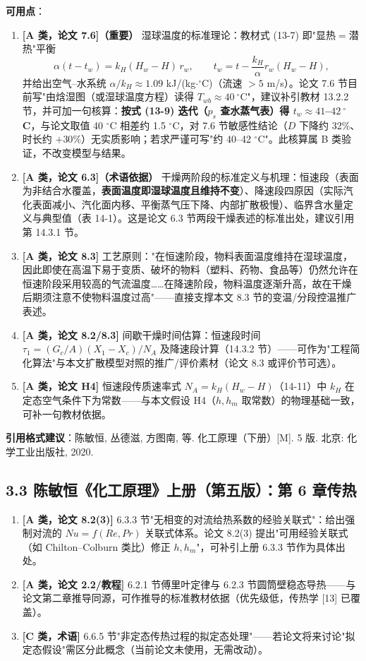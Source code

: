 \documentclass[12pt,a4paper]{ctexart}
\begin{document}
\textbf{可用点}：

\begin{enumerate}[leftmargin=2em]
\item \textbf{[A 类，论文 7.6]（重要）} 湿球温度的标准理论：教材式 (13-7) 即"显热$=$潜热"平衡
\begin{equation}
\alpha(t-t_w)=k_H(H_w-H)\,r_w,\qquad
t_w=t-\frac{k_H}{\alpha}r_w(H_w-H),
\end{equation}
并给出空气--水系统 $\alpha/k_H\approx1.09$ kJ/(kg$\cdot$$^\circ$C)（流速 $>5$ m/s）。论文 7.6 节目前写"由焓湿图（或湿球温度方程）读得 $T_{wb}\approx40\ ^\circ$C"，建议补引教材 13.2.2 节，并可加一句核算：\textbf{按式 (13-9) 迭代（$p_s$ 查水蒸气表）得 $t_w\approx41$--$42\ ^\circ$C}，与论文取值 40 $^\circ$C 相差约 1.5 $^\circ$C，对 7.6 节敏感性结论（$D$ 下降约 32\%、时长约 $+30\%$）无实质影响；若求严谨可写"约 40--42 $^\circ$C"。此核算属 B 类验证，不改变模型与结果。
\item \textbf{[A 类，论文 6.3]（术语依据）} 干燥两阶段的标准定义与机理：恒速段（表面为非结合水覆盖，\textbf{表面温度即湿球温度且维持不变}）、降速段四原因（实际汽化表面减小、汽化面内移、平衡蒸气压下降、内部扩散极慢）、临界含水量定义与典型值（表 14-1）。这是论文 6.3 节两段干燥表述的标准出处，建议引用第 14.3.1 节。
\item \textbf{[A 类，论文 8.3]} 工艺原则："在恒速阶段，物料表面温度维持在湿球温度，因此即使在高温下易于变质、破坏的物料（塑料、药物、食品等）仍然允许在恒速阶段采用较高的气流温度……在降速阶段，物料温度逐渐升高，故在干燥后期须注意不使物料温度过高"——直接支撑本文 8.3 节的变温/分段控温推广表述。
\item \textbf{[A 类，论文 8.2/8.3]} 间歇干燥时间估算：恒速段时间 $\tau_1=(G_c/A)(X_1-X_c)/N_A$ 及降速段计算（14.3.2 节）——可作为"工程简化算法"与本文扩散模型对照的推广/评价素材（论文 8.3 或评价节可选）。
\item \textbf{[A 类，论文 H4]} 恒速段传质速率式 $N_A=k_H(H_w-H)$（14-11）中 $k_H$ 在定态空气条件下为常数——与本文假设 H4（$h,h_m$ 取常数）的物理基础一致，可补一句教材依据。
\end{enumerate}

\textbf{引用格式建议}：陈敏恒, 丛德滋, 方图南, 等. 化工原理（下册）[M]. 5 版. 北京: 化学工业出版社, 2020.

\subsection{3.3 陈敏恒《化工原理》上册（第五版）：第 6 章传热}

\begin{enumerate}[leftmargin=2em]
\item \textbf{[A 类，论文 8.2(3)]} 6.3.3 节"无相变的对流给热系数的经验关联式"：给出强制对流的 $Nu=f(Re,Pr)$ 关联式体系。论文 8.2(3) 提出"可用经验关联式（如 Chilton--Colburn 类比）修正 $h,h_m$"，可补引上册 6.3.3 节作为具体出处。
\item \textbf{[A 类，论文 2.2/教程]} 6.2.1 节傅里叶定律与 6.2.3 节圆筒壁稳态导热——与论文第二章推导同源，可作推导的标准教材依据（优先级低，传热学 [13] 已覆盖）。
\item \textbf{[C 类，术语]} 6.6.5 节"非定态传热过程的拟定态处理"——若论文将来讨论"拟定态假设"需区分此概念（当前论文未使用，无需改动）。
\end{enumerate}
\end{document}
